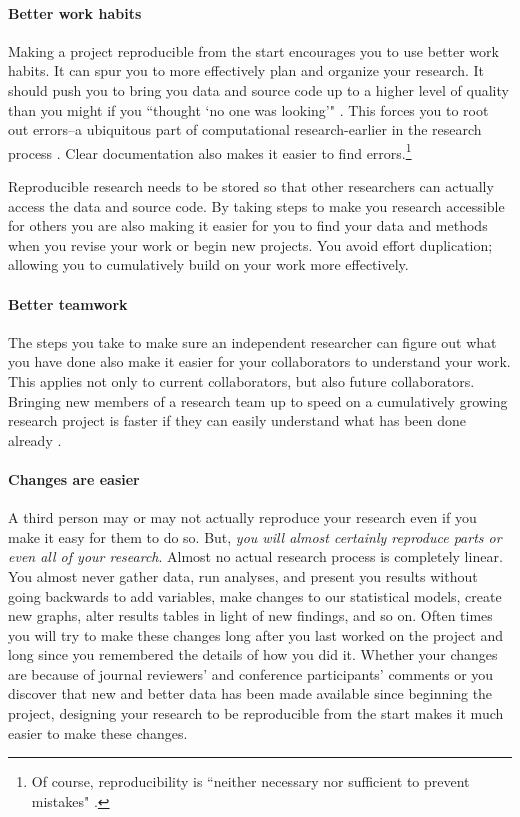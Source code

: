 \paragraph{Better work habits}
Making a project reproducible from the start encourages you to use better work habits. It can spur you to more effectively plan and organize your research. It should push you to bring you data and source code up to a higher level of quality than you might if you ``thought `no one was looking'" \cite[386]{Donoho2010}. This forces you to root out errors--a ubiquitous part of computational research-earlier in the research process \cite[385]{Donoho2010}. Clear documentation also makes it easier to find errors.\footnote{Of course, reproducibility is ``neither necessary nor sufficient to prevent mistakes" \cite[]{Stodden2009b}.}

Reproducible research needs to be stored so that other researchers can actually access the data and source code. By taking steps to make you research accessible for others you are also making it easier for you to find your data and methods when you revise your work or begin new projects. You avoid effort duplication; allowing you to cumulatively build on your work more effectively.

\paragraph{Better teamwork}
The steps you take to make sure an independent researcher can figure out what you have done also make it easier for your collaborators to understand your work. This applies not only to current collaborators, but also future collaborators. Bringing new members of a research team up to speed on a cumulatively growing research project is faster if they can easily understand what has been done already \cite[386]{Donoho2010}. 

\paragraph{Changes are easier}
A third person may or may not actually reproduce your research even if you make it easy for them to do so. But, {\emph{you will almost certainly reproduce parts or even all of your research}}. Almost no actual research process is completely linear. You almost never gather data, run analyses, and present you results without going backwards to add variables, make changes to our statistical models, create new graphs, alter results tables in light of new findings, and so on. Often times you will try to make these changes long after you last worked on the project and long since you remembered the details of how you did it. Whether your changes are because of journal reviewers' and conference participants' comments or you discover that new and better data has been made available since beginning the project, designing your research to be reproducible from the start makes it much easier to make these changes.  

